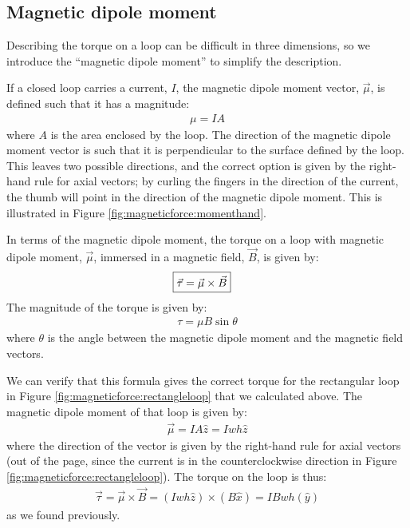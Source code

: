 \subsection{Magnetic dipole moment}
\label{sec:MagneticForce:dipolemoment}
Describing the torque on a loop can be difficult in three dimensions, so we introduce the ``magnetic dipole moment'' to simplify the description.

If a closed loop carries a current, $I$, the magnetic dipole moment vector, $\vec \mu$, is defined such that it has a magnitude:
\begin{align*}
\mu = IA
\end{align*}
where $A$ is the area enclosed by the loop. The direction of the magnetic dipole moment vector is such that it is perpendicular to the surface defined by the loop. This leaves two possible directions, and the correct option is given by the right-hand rule for axial vectors; by curling the fingers in the direction of the current, the thumb will point in the direction of the magnetic dipole moment. This is illustrated in Figure \ref{fig:magneticforce:momenthand}.

In terms of the magnetic dipole moment, the torque on a loop with magnetic dipole moment, $\vec \mu$, immersed in a magnetic field, $\vec B$, is given by:
\begin{align*}
\Aboxed{\vec \tau = \vec \mu \times \vec B}
\end{align*}
The magnitude of the torque is given by:
\begin{align*}
\tau =\mu B \sin\theta
\end{align*}
where $\theta$ is the angle between the magnetic dipole moment and the magnetic field vectors.

We can verify that this formula gives the correct torque for the rectangular loop in Figure \ref{fig:magneticforce:rectangleloop} that we calculated above. The magnetic dipole moment of that loop is given by:
\begin{align*}
\vec \mu = IA \hat z = Iwh\hat z
\end{align*}
where the direction of the vector is given by the right-hand rule for axial vectors (out of the page, since the current is in the counterclockwise direction in Figure \ref{fig:magneticforce:rectangleloop}). The torque on the loop is thus:
\begin{align*}
\vec \tau = \vec \mu \times \vec B = (Iwh\hat z) \times (B\hat x) = IBwh (\hat y)
\end{align*}
as we found previously.

